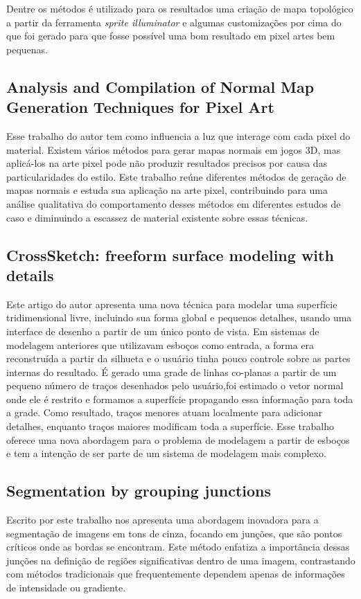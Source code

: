 Dentre os métodos é utilizado para os resultados uma criação de mapa topológico a partir da ferramenta \textit{sprite illuminator} e algumas customizações por cima do que foi gerado para que fosse possível uma bom resultado em pixel artes bem pequenas.

\subsection{Analysis and Compilation of Normal Map Generation Techniques for Pixel Art}

Esse trabalho do autor  tem como influencia a luz que interage com cada pixel do material. Existem vários métodos para gerar mapas normais em jogos 3D, mas aplicá-los na arte pixel pode não produzir resultados precisos por causa das particularidades do estilo. Este trabalho reúne diferentes métodos de geração de mapas normais e estuda sua aplicação na arte pixel, contribuindo para uma análise qualitativa do comportamento desses métodos em diferentes estudos de caso e diminuindo a escassez de material existente sobre essas técnicas.

\subsection{CrossSketch: freeform surface modeling with details}

Este artigo do autor  apresenta uma nova técnica para modelar uma superfície tridimensional livre, incluindo sua forma global e pequenos detalhes, usando uma interface de desenho a partir de um único ponto de vista. Em sistemas de modelagem anteriores que utilizavam esboços como entrada, a forma era reconstruída a partir da silhueta e o usuário tinha pouco controle sobre as partes internas do resultado. É gerado uma grade de linhas co-planas a partir de um pequeno número de traços desenhados pelo usuário,foi estimado o vetor normal onde ele é restrito e formamos a superfície propagando essa informação para toda a grade. Como resultado, traços menores atuam localmente para adicionar detalhes, enquanto traços maiores modificam toda a superfície. Esse trabalho oferece uma nova abordagem para o problema de modelagem a partir de esboços e tem a intenção de ser parte de um sistema de modelagem mais complexo.

\subsection{Segmentation by grouping junctions}

Escrito por  este trabalho nos apresenta uma abordagem inovadora para a segmentação de imagens em tons de cinza, focando em junções, que são pontos críticos onde as bordas se encontram. 
Este método enfatiza a importância dessas junções na definição de regiões significativas dentro de uma imagem, contrastando com métodos tradicionais que frequentemente dependem apenas de informações de intensidade ou gradiente.